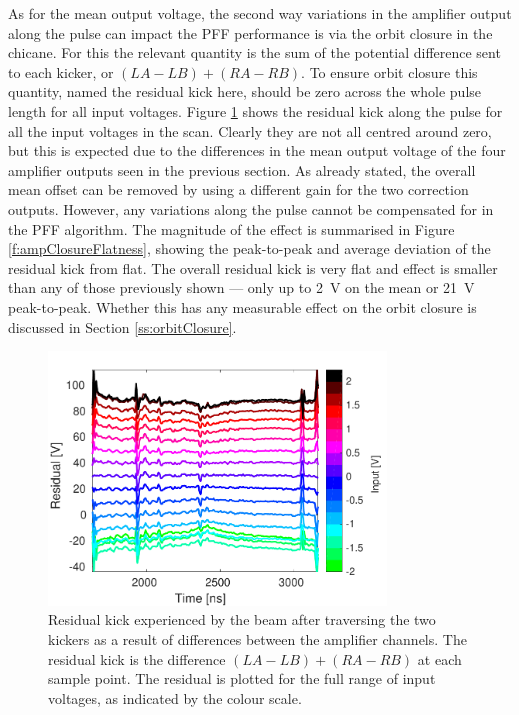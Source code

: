 As for the mean output voltage, the second way variations in the amplifier output along the pulse can impact the PFF performance is via the orbit closure in the chicane. For this the relevant quantity is the sum of the potential difference sent to each kicker, or \((LA-LB)+(RA-RB)\). To ensure orbit closure this quantity, named the residual kick here, should be zero across the whole pulse length for all input voltages. Figure \ref{f:ampClosure} shows the residual kick along the pulse for all the input voltages in the scan. Clearly they are not all centred around zero, but this is expected due to the differences in the mean output voltage of the four amplifier outputs seen in the previous section. As already stated, the overall mean offset can be removed by using a different gain for the two correction outputs. However, any variations along the pulse cannot be compensated for in the PFF algorithm. The magnitude of the effect is summarised in Figure \ref{f:ampClosureFlatness}, showing the peak-to-peak and average deviation of the residual kick from flat. The overall residual kick is very flat and effect is smaller than any of those previously shown --- only up to 2~V on the mean or 21~V peak-to-peak. Whether this has any measurable effect on the orbit closure is discussed in Section \ref{ss:orbitClosure}.

\begin{figure}
  \centering
  \includegraphics[width=0.8\textwidth]{Figures/commissioning/residualKick_Traces}
  \caption{Residual kick experienced by the beam after traversing the two kickers as a result of differences between the amplifier channels. The residual kick is the difference \((LA-LB)+(RA-RB)\) at each sample point. The residual is plotted for the full range of input voltages, as indicated by the colour scale.}
  \label{f:ampClosure}
\end{figure}

